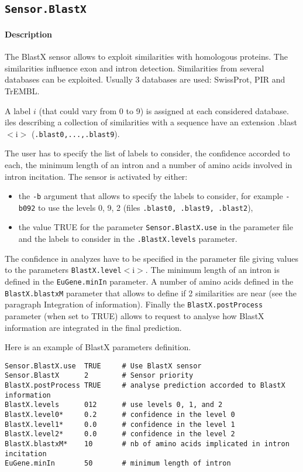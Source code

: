 
\subsection{\texttt{Sensor.BlastX}}

\paragraph{Description}

The BlastX sensor allows to exploit similarities with homologous
proteins. The similarities influence exon and intron detection.
Similarities from several databases can be exploited. Usually 3
databases are used: SwissProt, PIR and TrEMBL.

A label $i$ (that could vary from 0 to 9) is assigned at each
considered database. iles describing a collection of similarities with
a sequence have an extension .blast$<$i$>$ (\texttt{.blast0,...,.blast9}).

The user has to specify the list of labels to consider, the
confidence accorded to each, the minimum length of an intron and a
number of amino acids involved in intron incitation.  The sensor is
activated by either:
\begin{itemize}
\item the \texttt{-b} argument 
  that allows to specify the labels to consider, for example
  \texttt{-b092} to use the levels 0, 9, 2 (files \texttt{.blast0,
    .blast9, .blast2}),
\item the value TRUE for the parameter \texttt{Sensor.BlastX.use} in
  the parameter file and the labels to consider in the
  \texttt{.BlastX.levels} parameter.
\end{itemize}
The confidence in analyzes have to be specified in the parameter file
giving values to the parameters \texttt{BlastX.level}$<$i$>$.  The
minimum length of an intron is defined in the \texttt{EuGene.minIn}
parameter.  A number of amino acids defined in the
\texttt{BlastX.blastxM} parameter that allows to define if 2
similarities are near (see the paragraph Integration of information).
Finally the \texttt{BlastX.postProcess} parameter (when set to TRUE)
allows to request to analyse how BlastX information are integrated in
the final prediction.

Here is an example of BlastX parameters definition.
\begin{Verbatim}[fontsize=\small]
Sensor.BlastX.use  TRUE     # Use BlastX sensor
Sensor.BlastX      2        # Sensor priority
BlastX.postProcess TRUE     # analyse prediction accorded to BlastX information
BlastX.levels      012      # use levels 0, 1, and 2
BlastX.level0*     0.2      # confidence in the level 0
BlastX.level1*     0.0      # confidence in the level 1
BlastX.level2*     0.0      # confidence in the level 2
BlastX.blastxM*    10       # nb of amino acids implicated in intron incitation
EuGene.minIn       50       # minimum length of intron
\end{Verbatim}

